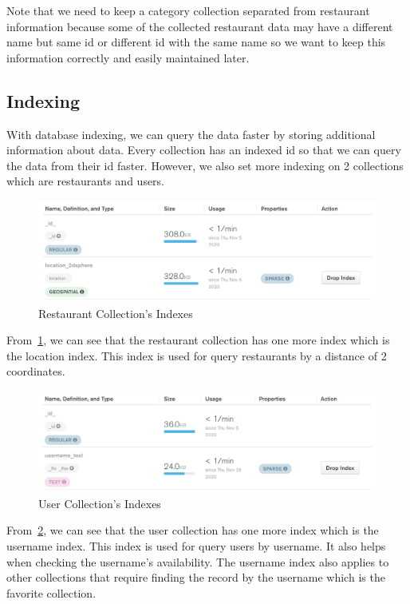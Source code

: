 \documentclass[12pt,oneside,openright,a4paper]{cpe-english-project}
\begin{document}
Note that we need to keep a category collection separated from restaurant information because some of the collected restaurant data may have a different name but same id or different id with the same name so we want to keep this information correctly and easily maintained later.


\subsection{Indexing}

With database indexing, we can query the data faster by storing additional information about data. Every collection has an indexed id so that we can query the data from their id faster. However, we also set more indexing on 2 collections which are restaurants and users.

\begin{figure}[!h]\centering
\includegraphics[width=400pt]{./images/3db_RestaurantCollectionsIndexes.png}
\caption{Restaurant Collection’s Indexes}\label{fig:3db_RestaurantCollectionsIndexes}
\end{figure}

From~\ref{fig:3db_RestaurantCollectionsIndexes}, we can see that the restaurant collection has one more index which is the location index. This index is used for query restaurants by a distance of 2 coordinates.
\begin{figure}[!h]\centering
\includegraphics[width=400pt]{./images/3db_UserCollectionsIndexes.png}
\caption{User Collection’s Indexes}\label{fig:3db_UserCollectionsIndexes}
\end{figure}

From~\ref{fig:3db_UserCollectionsIndexes}, we can see that the user collection has one more index which is the username index. This index is used for query users by username. It also helps when checking the username’s availability. The username index also applies to other collections that require finding  the record by the username which is the favorite collection.
\end{document}
